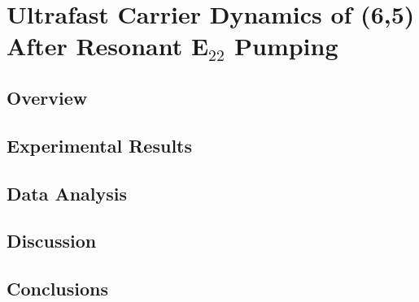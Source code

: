 \chapter{Ultrafast Carrier Dynamics of (6,5) After Resonant E$_{22}$ Pumping}

\section{Overview}

\section{Experimental Results}


\section{Data Analysis}

\section{Discussion}

\section{Conclusions}